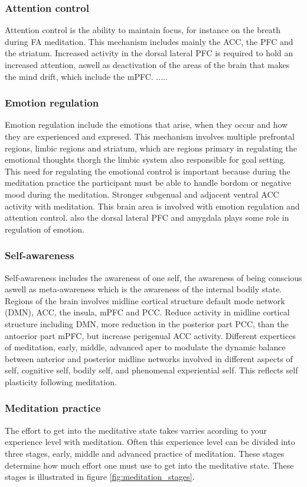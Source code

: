 \subsubsection{Attention control}
Attention control is the ability to maintain focus, for instance on the breath during FA meditation. This mechanism includes mainly the ACC, the PFC and the striatum. 
Increased activity in the dorsal lateral PFC is required to hold an increased attention, aswell as deactivation of the areas of the brain that makes the mind drift, which include the mPFC. \cite{Tang2017}.....
\subsubsection{Emotion regulation}
Emotion regulation include the emotions that arise, when they occur and how they are experienced and expresed. This mechanism involves multiple prefrontal regions, limbic regions and striatum, which are regions primary in regulating the emotional thoughts thorgh the limbic system also responsible for goal setting. This need for regulating the emotional control is important because during the meditation practice the participant must be able to handle bordom or negative mood during the meditation. Stronger subgenual and adjacent ventral ACC activity with meditation. This brain area is involved with emotion regulation and attention control. also the dorsal lateral PFC and amygdala plays some role in regulation of emotion. 
\subsubsection{Self-awareness}
Self-awareness includes the awareness of one self, the awareness of being conscious aswell as meta-awareness which is the awareness of the internal bodily state. Regions of the brain involves midline cortical structure default mode network (DMN), ACC, the insula, mPFC and PCC. Reduce activity in midline cortical structure including DMN, more reduction in the posterior part PCC, than the antoerior part mPFC, but increase perigenual ACC activity.
Different expertices of meditation, early, middle, advanced aper to modulate the dynamic balance between anterior and posterior midline networks involved in different aspects of self, cognitive self, bodily self, and phenomenal experiential self. This reflects self plasticity following meditation. 

\subsubsection{Meditation practice}
The effort to get into the meditative state takes varries acording to your experience level with meditation. Often this experience level can be divided into three stages, early, middle and advanced practice of meditation. These stages determine how much effort one must use to get into the meditative state. These stages is illustrated in figure \ref{fig:meditation_stages}.

